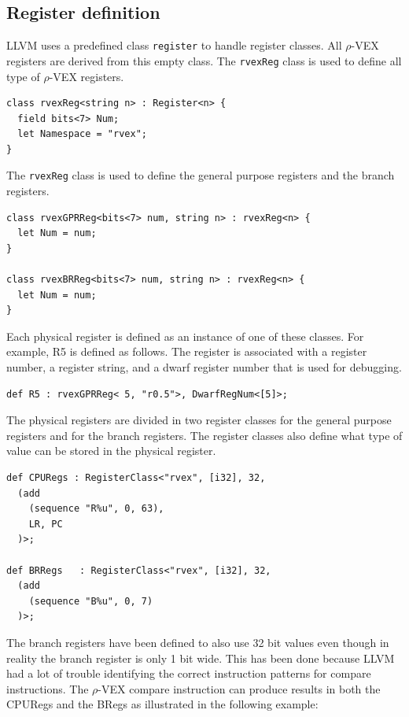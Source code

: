 \subsection{Register definition}
LLVM uses a predefined class \texttt{register} to handle register classes. All $\rho$-VEX registers are derived from this empty class. The \texttt{rvexReg} class is used to define all type of $\rho$-VEX registers. 

\begin{lstlisting}[language=tblgen]
class rvexReg<string n> : Register<n> {
  field bits<7> Num;
  let Namespace = "rvex";
}
\end{lstlisting}

The \texttt{rvexReg} class is used to define the general purpose registers and the branch registers.
\begin{lstlisting}[language=tblgen]
class rvexGPRReg<bits<7> num, string n> : rvexReg<n> {
  let Num = num;
}

class rvexBRReg<bits<7> num, string n> : rvexReg<n> {
  let Num = num;
}
\end{lstlisting}

Each physical register is defined as an instance of one of these classes. For example, R5 is defined as follows. The register is associated with a register number, a register string, and a dwarf register number that is used for debugging.

\begin{lstlisting}[language=tblgen]
def R5 : rvexGPRReg< 5, "r0.5">, DwarfRegNum<[5]>;
\end{lstlisting}

The physical registers are divided in two register classes for the general purpose registers and for the branch registers. The register classes also define what type of value can be stored in the physical register.

\begin{lstlisting}[language=tblgen]
def CPURegs : RegisterClass<"rvex", [i32], 32, 
  (add
    (sequence "R%u", 0, 63),
    LR, PC
  )>;

def BRRegs   : RegisterClass<"rvex", [i32], 32, 
  (add 
    (sequence "B%u", 0, 7)
  )>;
\end{lstlisting}

The branch registers have been defined to also use 32 bit values even though in reality the branch register is only 1 bit wide. This has been done because LLVM had a lot of trouble identifying the correct instruction patterns for compare instructions. The $\rho$-VEX compare instruction can produce results in both the CPURegs and the BRegs as illustrated in the following example:

